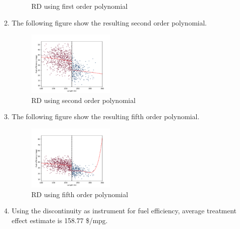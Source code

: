 \documentclass{article}
\begin{document}
\begin{enumerate}
\begin{figure}[H]
        \caption{RD using first order polynomial}
        \label{f:RD_1} 
    \end{figure}
    \item The following figure show the resulting second order polynomial.
    \begin{figure}[H]
        \centering
        \includegraphics[width=0.4\textwidth]{./figure/RD_2.pdf}
        \caption{RD using second order polynomial}
        \label{f:RD_2} 
    \end{figure}
    \item The following figure show the resulting fifth order polynomial.
    \begin{figure}[H]
        \centering
        \includegraphics[width=0.4\textwidth]{./figure/RD_3.pdf}
        \caption{RD using fifth order polynomial}
        \label{f:RD_3} 
    \end{figure}
    \item Using the discontinuity as instrument for fuel efficiency, average treatment effect estimate is 158.77 \$/mpg.
\end{enumerate}
\end{document}
